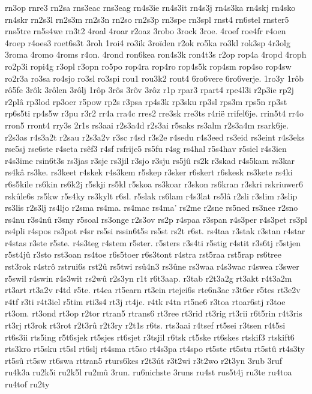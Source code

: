 {rn3op
rnre3
rn2sa
rns3eac
rns3eag
rn4s3ie
rn4s3it
rn4s3j
rn4s3ka
rn4skj
rn4sko
rn4skr
rn2s3l
rn2s3m
rn2s3n
rn2so
rn2s3p
rn3spe
rn3spl
rnst4
rn6stel
rnster5
rns5tre
rn5s4we
rn3t2
4roal
4roar
r2oaz
3robo
3rock
3roe.
4roef
roe4fr
r4oen
4roep
r4oes3
roet6s3t
3roh
1roi4
ro3ik
3roïden
r2ok
ro5ka
ro3kl
rok3sp
4r3olg
3roma
4romo
4roms
r4on.
4rond
ron6kea
ron4s3k
ron4t3s
r2op
rop4a
4ropd
4roph
ro2p3i
ropi4g
r3opl
r3opn
ro5po
rop4ra
rop4ro
rop4s5k
rop4sm
rop4so
rop4sw
ro2r3a
ro3sa
ro4sjo
ro3sl
ro3spi
rou1
rou3k2
rout4
6ro6vere
6ro6verje.
1ro3y
1rôb
rô5fe
3rôk
3rôlen
3rôlj
1rôp
3rôs
3rôv
3rôz
r1p
rpar3
rpart4
rpe4l3i
r2p3ie
rp2j
r2plâ
rp3lod
rp3oer
r5pow
rp2s
r3psa
rp4s3k
rp3sku
rp3sl
rps3m
rps5n
rp3st
rp6s5ti
rp4s5w
r3pu
r3r2
rr4a
rra4c
rres2
rre3sk
rre3ts
r4rië
rrifel6je.
rrin5t4
rr4o
rron5
rront4
rry3s
2r1s
rs3aai
r2s3a4d
r2s3ai
r5saks
rs3alm
r2s3a4m
rsark6je.
r2s3as
r4s3a2t
r2sau
r2s3a2v
r3sc
r4sd
r3s2e
r4sedu
r4s3eed
rs3eid
rs3eint
r4s3eks
rse5sj
rse6ste
r4seta
rsêf3
r4sf
rsfrije5
rs5fu
r4sg
rs4hal
r5s4hav
r5siel
r4s3ien
r4s3ime
rsin6t3s
rs3jas
r3sje
rs3jil
r3sjo
r3sju
rs5jû
rs2k
r3skad
r4s5kam
rs3kar
rs4kâ
rs3ke.
rs3keet
r4skek
r4s3kem
r5skep
r3sker
r6skert
r6skesk
rs3kete
rs4ki
r6s5kile
rs6kin
rs6k2j
r5skji
rs5kl
r5skoa
rs3koar
r3skon
rs6kran
r3skri
rskriuwer6
rskûle6s
rs5kw
r5s4ky
rs3kylt
r6sl.
r5slak
rs6lam
r4s3lat
rs5lâ
r2sli
r3slim
r3slip
rs3lis
r2s3lj
rs4ljo
r2sma
rs4ma.
rs4mac
rs4ma'
rs2me
r2sne
rs5ned
rs3nee
r2sno
rs4nu
r3s4nû
r3sny
r5soal
rs3onge
r2s3ov
rs2p
r4spaa
r3span
r4s3per
r4s3pet
rs3pl
rs4pli
r4spos
rs3pot
r4sr
rs5si
rssin6t5s
rs5st
rs2t
r6st.
rs4taa
r3stak
r3stan
r4star
r4stas
r3ste
r5ste.
r4s3teg
r4stem
r5ster.
r5sters
r3s4ti
r5stig
r4stit
r3s6tj
r5stjen
r5st4jû
r3sto
rst3oan
rs4toe
r6s5toer
r6s3tont
r4stra
rst5raa
rst5rap
rs6tree
rst3rok
r4strô
rstrui6s
rst2û
rs5twi
rsû4n3
rs3ûne
rs3waa
r4s3wac
r4swea
r3swer
r5swil
r4swin
r4s3wit
rs2wû
r2s3yn
r1t
r6t3aap.
r3tab
r2t3a2g
rt3akt
r4t3a2m
rt3art
rt3a2v
r4td
r5te.
rt4ea
rt5earn
rt3ein
rtejei6s
rte6n3ac
r3t6er
r5tes
rt3e2v
r4tf
r3ti
r4t3iel
r5tim
rti3s4
rt3j
rt4je.
r4tk
r4tn
rt5ne6
r3toa
rtoar6stj
r3toe
rt3om.
rt3ond
rt3op
r2tor
rtran5
rtrans6
rt3ree
rt3rid
rt3rig
rt3rii
r6t5rin
r4t3ris
rt3rj
rt3rok
rt3rot
r2t3rû
r2t3ry
r2t1s
r6ts.
rts3aai
r4tsef
rt5sei
r3tsen
r4t5si
rt6s3ii
rts5ing
r5t6sjek
rt5sjes
rt6sjet
r3tsjil
r6tsk
rt5ske
rt6skes
rtskif3
rtskift6
rts3kro
rt5sku
rt5sl
rt6slj
rt4sma
rt5so
rt4s3pa
rt4spo
rt5ste
rt5stu
rt5stû
rt4s3ty
rt5sû
rt5sw
rt6swa
rttran5
rturs6kes
r2t3út
r3t2wi
r3t2wo
r2t3yn
3rub
3ruf
ru4k3a
ru2k5i
ru2k5l
ru2mû
3run.
ru6nichste
3runs
ru4st
rus5t4j
ru3te
ru4toa
ru4tof
ru2ty
}
